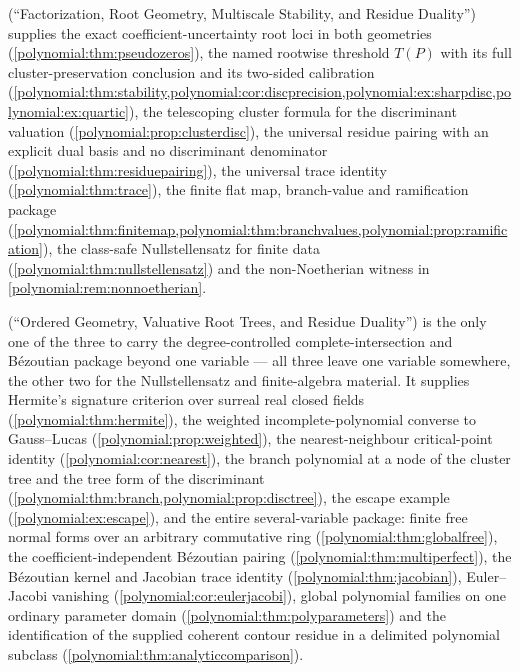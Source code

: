 \documentclass[11pt,letterpaper]{article}
\numberwithin{equation}{section}
\theoremstyle{definition}
\theoremstyle{remark}\newtheorem{remark}[theorem]{Remark}
\begin{document}
\cite{polynomial:MsFactorization} (``Factorization, Root Geometry,
Multiscale Stability, and Residue Duality'') supplies the exact
coefficient-uncertainty root loci in both geometries
(\cref{polynomial:thm:pseudozeros}), the named rootwise threshold $T(P)$ with
its full cluster-preservation conclusion and its two-sided calibration
(\cref{polynomial:thm:stability,polynomial:cor:discprecision,polynomial:ex:sharpdisc,polynomial:ex:quartic}),
the telescoping cluster formula for the discriminant valuation
(\cref{polynomial:prop:clusterdisc}), the universal residue pairing with an
explicit dual basis and no discriminant denominator
(\cref{polynomial:thm:residuepairing}), the universal trace identity
(\cref{polynomial:thm:trace}), the finite flat map, branch-value and
ramification package
(\cref{polynomial:thm:finitemap,polynomial:thm:branchvalues,polynomial:prop:ramification}),
the class-safe Nullstellensatz for finite data
(\cref{polynomial:thm:nullstellensatz}) and the non-Noetherian witness in
\cref{polynomial:rem:nonnoetherian}.

\cite{polynomial:MsTrees} (``Ordered Geometry, Valuative Root Trees, and
Residue Duality'') is the only one of the three to carry the
degree-controlled complete-intersection and B\'ezoutian package beyond one
variable --- all three leave one variable somewhere, the other two for the
Nullstellensatz and finite-algebra material. It
supplies Hermite's signature criterion over surreal real closed fields
(\cref{polynomial:thm:hermite}), the weighted incomplete-polynomial converse
to Gauss--Lucas (\cref{polynomial:prop:weighted}), the nearest-neighbour
critical-point identity (\cref{polynomial:cor:nearest}), the branch polynomial
at a node of the cluster tree and the tree form of the discriminant
(\cref{polynomial:thm:branch,polynomial:prop:disctree}), the escape example
(\cref{polynomial:ex:escape}), and the entire several-variable package:
finite free normal forms over an arbitrary commutative ring
(\cref{polynomial:thm:globalfree}), the coefficient-independent B\'ezoutian
pairing (\cref{polynomial:thm:multiperfect}), the B\'ezoutian kernel and
Jacobian trace identity (\cref{polynomial:thm:jacobian}), Euler--Jacobi
vanishing (\cref{polynomial:cor:eulerjacobi}), global polynomial families on
one ordinary parameter domain (\cref{polynomial:thm:polyparameters}) and the
identification of the supplied coherent contour residue in a delimited
polynomial subclass (\cref{polynomial:thm:analyticcomparison}).
\end{document}
